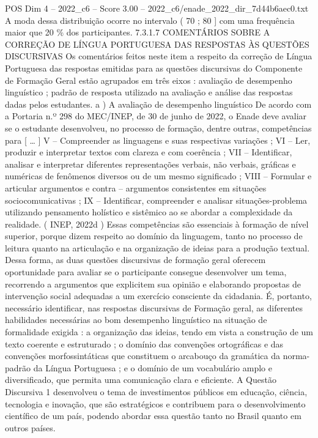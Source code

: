 \begin{textsample}{POS Dim 4 – 2022\_c6 – Score 3.00 – 2022\_c6/enade\_2022\_dir\_7d44b6aec0.txt}
A moda dessa distribuição ocorre no intervalo ( 70 ; 80 ] com uma frequência maior que 20 \% dos participantes. 7.3.1.7 COMENTÁRIOS SOBRE A CORREÇÃO DE LÍNGUA PORTUGUESA DAS RESPOSTAS ÀS QUESTÕES DISCURSIVAS Os comentários feitos neste item a respeito da correção de Língua Portuguesa das respostas emitidas para as questões discursivas do Componente de Formação Geral estão agrupados em três eixos : avaliação de desempenho linguístico ; padrão de resposta utilizado na avaliação e análise das respostas dadas pelos estudantes. a ) A avaliação de desempenho linguístico De acordo com a Portaria n.º 298 do MEC/INEP, de 30 de junho de 2022, o Enade deve avaliar se o estudante desenvolveu, no processo de formação, dentre outras, competências para [ … ] V – Compreender as linguagens e suas respectivas variações ; VI – Ler, produzir e interpretar textos com clareza e com coerência ; VII – Identificar, analisar e interpretar diferentes representações verbais, não verbais, gráficas e numéricas de fenômenos diversos ou de um mesmo significado ; VIII – Formular e articular argumentos e contra – argumentos consistentes em situações sociocomunicativas ; IX – Identificar, compreender e analisar situações-problema utilizando pensamento holístico e sistêmico ao se abordar a complexidade da realidade. ( INEP, 2022d ) Essas competências são essenciais à formação de nível superior, porque dizem respeito ao domínio da linguagem, tanto no processo de leitura quanto na articulação e na organização de ideias para a produção textual.
Dessa forma, as duas questões discursivas de formação geral oferecem oportunidade para avaliar se o participante consegue desenvolver um tema, recorrendo a argumentos que explicitem sua opinião e elaborando propostas de intervenção social adequadas a um exercício consciente da cidadania.
É, portanto, necessário identificar, nas respostas discursivas de Formação geral, as diferentes habilidades necessárias ao bom desempenho linguístico na situação de formalidade exigida : a organização das ideias, tendo em vista a construção de um texto coerente e estruturado ; o domínio das convenções ortográficas e das convenções morfossintáticas que constituem o arcabouço da gramática da norma-padrão da Língua Portuguesa ; e o domínio de um vocabulário amplo e diversificado, que permita uma comunicação clara e eficiente.
A Questão Discursiva 1 desenvolveu o tema de investimentos públicos em educação, ciência, tecnologia e inovação, que são estratégicos e contribuem para o desenvolvimento científico de um país, podendo abordar essa questão tanto no Brasil quanto em outros países.

\end{textsample}

